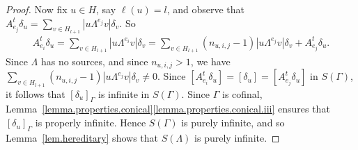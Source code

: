 \documentclass[a4paper, 12pt]{amsart}
\numberwithin{equation}{section}
\theoremstyle{remark}
\theoremstyle{definition}
\begin{document}
\begin{proof}
Now fix $u \in H$, say $\ell(u) = l$, and observe that $A^t_{e_j}\delta_u = \sum_{v \in
H_{l+1}} |u\Lambda^{e_j} v|\delta_{v}$. So
\begin{align*}
A^t_{e_i}\delta_u
    = \sum_{v \in H_{l+1}} |u\Lambda^{e_i} v|\delta_{v}
    = \sum_{v \in H_{l+1}} (n_{u, i, j} - 1) |u\Lambda^{e_j} v|\delta_{v} + A^t_{e_j}\delta_u.
\end{align*}
Since $\Lambda$ has no sources, and since $n_{u,i,j} > 1$, we have $\sum_{v \in H_{l+1}}
(n_{u, i, j} - 1) |u\Lambda^{e_j} v|\delta_{v} \not= 0$. Since $[A^t_{e_i} \delta_u] =
[\delta_u] = [A^t_{e_j} \delta_u]$ in $S(\Gamma)$, it follows that ${{[{\delta_u}]_\Gamma}}$ is
infinite in $S(\Gamma)$. Since $\Gamma$ is cofinal,
Lemma~\ref{lemma.properties.conical}\eqref{lemma.properties.conical.iii} ensures that ${{[{\delta_u}]_\Gamma}}$ is properly infinite. Hence
$S(\Gamma)$ is purely infinite, and so Lemma~\ref{lem.hereditary} shows that $S(\Lambda)$
is purely infinite.
\end{proof}
\end{document}
